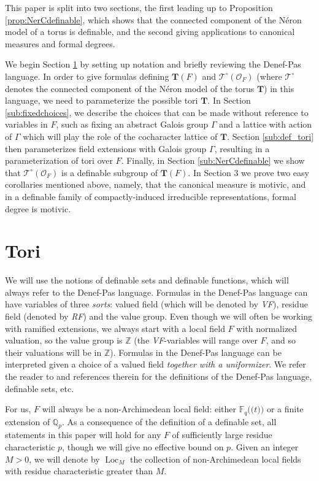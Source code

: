 \documentclass{amsart}
\newcommand{\Q}{{\mathbb Q}}
\newcommand{\F}{{\mathbb F}}
\newcommand{\Z}{{\mathbb Z}}
\newcommand{\ri}{\mathcal{O}}
\DeclareMathOperator{\loc}{Loc}
\newcommand{\bT}{\mathbf {T}}
\newcommand{\NerC}[1]{\mathcal{#1}^\circ}
\def\llp{\mathopen{(\!(}}
\def\rrp{\mathopen{)\!)}}
\theoremstyle{plain}
\theoremstyle{definition}
\begin{document}
This paper is split into two sections, the first leading up to Proposition \ref{prop:NerCdefinable},
which shows that the connected component of the N\'eron model of a torus is definable,
and the second giving applications to canonical measures and formal degrees.

We begin Section \ref{sec:tori} by setting up notation and briefly reviewing the Denef-Pas language.  In order
to give formulas defining $\bT(F)$ and $\NerC{T}(\ri_F)$  (where $\NerC{T}$ denotes the connected
component of the N\'eron model of the torus $\bT$) in this language, we need to parameterize the possible tori $\bT$.
In Section \ref{sub:fixedchoices}, we describe the choices that can be made without reference to variables in $F$,
such as fixing an abstract Galois group $\Gamma$ and a lattice with action of $\Gamma$ which will play the role of the cocharacter lattice of $\bT$.
Section \ref{sub:def_tori} then parameterizes field extensions with Galois group $\Gamma$, resulting in a parameterization
of tori over $F$.  Finally, in Section \ref{sub:NerCdefinable} we show that $\NerC{T}(\ri_F)$ is a definable subgroup of $\bT(F)$.
In Section 3 we prove two easy corollaries mentioned above, namely, that the canonical measure is motivic,
and in a definable family of compactly-induced irreducible representations, formal degree is motivic. 

\section{Tori} \label{sec:tori}
We will use the notions of definable sets and definable functions, which will always refer to the Denef-Pas language. 
Formulas in the Denef-Pas language can have variables of three \emph{sorts}: valued field (which will be denoted by \emph{VF}),
residue field (denoted by \emph{RF}) and the value group. Even though we will often be working with ramified extensions,
we always start with a local field $F$ with normalized valuation, so the value group is $\Z$
(the \emph{VF}-variables will range over $F$, and so their valuations will be in $\Z$).
Formulas in the Denef-Pas language can be interpreted given a choice of a valued field \emph{together with a uniformizer}. 
We refer the reader to \cite{cluckers-gordon-halupczok:14c} and references therein for the definitions of the Denef-Pas language, definable sets, etc. 

For us, $F$ will always be a non-Archimedean local field: either $\F_q\llp t\rrp$ or a finite extension of $\Q_p$.
As a consequence of the definition of a definable set, all statements in this paper will hold for any $F$ of sufficiently large residue characteristic $p$, 
though we will give no effective bound on $p$. 
Given an integer $M>0$, we will denote by $\loc_M$ the collection of non-Archimedean local fields
with residue characteristic greater than $M$. 
\end{document}
